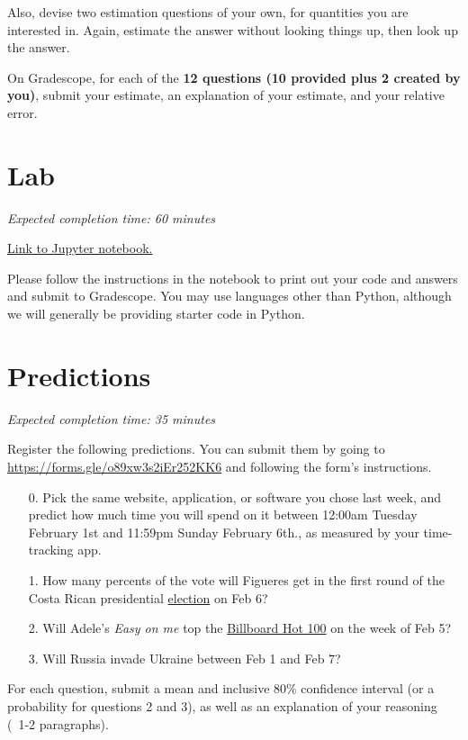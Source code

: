 \documentclass[11pt]{article}
\begin{document}
Also, devise two estimation questions of your own, for quantities you are interested in. Again, estimate the answer without looking things up, then look up the answer.

On Gradescope, for each of the \textbf{12 questions (10 provided plus 2 created by you)}, submit your estimate, an explanation of your estimate, and your relative error.


\section*{Lab}

\emph{Expected completion time: 60 minutes}

\href{https://datahub.berkeley.edu/hub/user-redirect/git-pull?repo=https%3A%2F%2Fgithub.com%2Fjs-d%2Fstat-157-260-website&urlpath=tree%2Fstat-157-260-website%2Fhw%2Fhw2%2Fhw2_lab.ipynb&branch=main}{Link to Jupyter notebook.} 

Please follow the instructions in the notebook to print out your code and answers and submit to Gradescope. You may use languages other than Python, although we will generally be providing starter code in Python.



\section*{Predictions}

\emph{Expected completion time: 35 minutes}

Register the following predictions. You can submit them by going to \url{https://forms.gle/o89xw3s2iEr252KK6} and following the form's instructions.

\begin{enumerate}
	\item[0.] Pick the same website, application, or software you chose last week, and predict how much time you will spend on it between 12:00am Tuesday February 1st and 11:59pm Sunday February 6th., as measured by your time-tracking app.
	
	\item[1.] How many percents of the vote will Figueres get in the first round of the Costa Rican presidential \href{https://en.wikipedia.org/wiki/2022_Costa_Rican_general_election}{election} on Feb 6?
	
	\item[2.] Will Adele's \textit{Easy on me} top the \href{https://www.billboard.com/charts/hot-100/}{Billboard Hot 100} on the week of Feb 5?
 
	\item[3.] Will Russia invade Ukraine between Feb 1 and Feb 7?
	
	
\end{enumerate}

For each question, submit a mean and inclusive 80\% confidence interval (or a probability for questions 2 and 3), as well as an explanation of your reasoning (~1-2 paragraphs).
\end{document}
